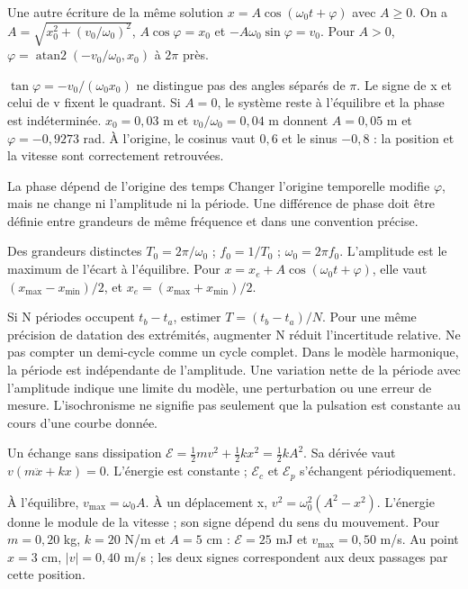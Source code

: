 \begin{loi}{Une autre écriture de la même solution}
$x=A\cos(\omega_0t+\varphi)$ avec $A\geq0$. On a $A=\sqrt{x_0^2+(v_0/\omega_0)^2}$, $A\cos\varphi=x_0$ et $-A\omega_0\sin\varphi=v_0$. Pour $A>0$, $\varphi=\operatorname{atan2}(-v_0/\omega_0,x_0)$ à $2\pi$ près.
\end{loi}
$\tan\varphi=-v_0/(\omega_0x_0)$ ne distingue pas des angles séparés de $\pi$. Le signe de x et celui de v fixent le quadrant. Si $A=0$, le système reste à l’équilibre et la phase est indéterminée.
$x_0=0{,}03$ m et $v_0/\omega_0=0{,}04$ m donnent $A=0{,}05$ m et $\varphi=-0{,}9273$ rad. À l’origine, le cosinus vaut $0{,}6$ et le sinus $-0{,}8$ : la position et la vitesse sont correctement retrouvées.
\begin{piege}{La phase dépend de l’origine des temps}
Changer l’origine temporelle modifie $\varphi$, mais ne change ni l’amplitude ni la période. Une différence de phase doit être définie entre grandeurs de même fréquence et dans une convention précise.
\end{piege}


\begin{loi}{Des grandeurs distinctes}
$T_0=2\pi/\omega_0$ ; $f_0=1/T_0$ ; $\omega_0=2\pi f_0$. L’amplitude est le maximum de l’écart à l’équilibre. Pour $x=x_e+A\cos(\omega_0t+\varphi)$, elle vaut $(x_{\max}-x_{\min})/2$, et $x_e=(x_{\max}+x_{\min})/2$.
\end{loi}
Si N périodes occupent $t_b-t_a$, estimer $T=(t_b-t_a)/N$. Pour une même précision de datation des extrémités, augmenter N réduit l’incertitude relative. Ne pas compter un demi-cycle comme un cycle complet.
Dans le modèle harmonique, la période est indépendante de l’amplitude. Une variation nette de la période avec l’amplitude indique une limite du modèle, une perturbation ou une erreur de mesure. L’isochronisme ne signifie pas seulement que la pulsation est constante au cours d’une courbe donnée.


\begin{loi}{Un échange sans dissipation}
$\mathcal E=\tfrac12mv^2+\tfrac12kx^2=\tfrac12kA^2$. Sa dérivée vaut $v(m\ddot x+kx)=0$. L’énergie est constante ; $\mathcal E_c$ et $\mathcal E_p$ s’échangent périodiquement.
\end{loi}
À l’équilibre, $v_{\max}=\omega_0A$. À un déplacement x, $v^2=\omega_0^2(A^2-x^2)$. L’énergie donne le module de la vitesse ; son signe dépend du sens du mouvement.
Pour $m=0{,}20$ kg, $k=20$ N/m et $A=5$ cm : $\mathcal E=25$ mJ et $v_{\max}=0{,}50$ m/s. Au point $x=3$ cm, $|v|=0{,}40$ m/s ; les deux signes correspondent aux deux passages par cette position.


